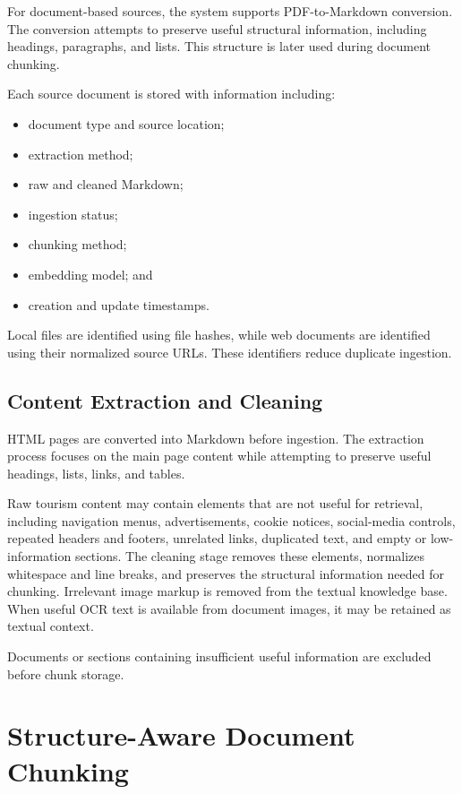 For document-based sources, the system supports PDF-to-Markdown conversion.
The conversion attempts to preserve useful structural information, including
headings, paragraphs, and lists. This structure is later used during document
chunking.

Each source document is stored with information including:

\begin{itemize}
    \item document type and source location;
    \item extraction method;
    \item raw and cleaned Markdown;
    \item ingestion status;
    \item chunking method;
    \item embedding model; and
    \item creation and update timestamps.
\end{itemize}

Local files are identified using file hashes, while web documents are
identified using their normalized source URLs. These identifiers reduce
duplicate ingestion.

\subsection{Content Extraction and Cleaning}

HTML pages are converted into Markdown before ingestion. The extraction
process focuses on the main page content while attempting to preserve useful
headings, lists, links, and tables.

Raw tourism content may contain elements that are not useful for retrieval,
including navigation menus, advertisements, cookie notices, social-media
controls, repeated headers and footers, unrelated links, duplicated text, and
empty or low-information sections. The cleaning stage removes these elements,
normalizes whitespace and line breaks, and preserves the structural information
needed for chunking. Irrelevant image markup is removed from the textual
knowledge base. When useful OCR text is available from document images, it may
be retained as textual context.

Documents or sections containing insufficient useful information are excluded
before chunk storage.

\section{Structure-Aware Document Chunking}

